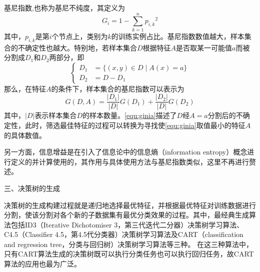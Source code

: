 基尼指数,也称为基尼不纯度，其定义为
\begin{equation}
    \label{equ:gini}
    G_i = 1 - \sum_{k=1}^n{p_{i,k}}^2
\end{equation}
其中，$p_{i,k}$是第$i$个节点上，类别为$k$的训练实例占比。基尼指数数值越大，样本集合的不确定性也越大。特别地，若样本集合$D$根据特征$A$是否取某一可能值$a$而被分割成$D_1$和$D_2$两部分，即
\begin{equation}
    \label{equ:daset}
    \left \{
    \begin{aligned}
        D_1 &= \{ (x,y) \in D \mid A(x) = a\} \\
        D_2 &= D - D_1
    \end{aligned}
    \right.
\end{equation}
那么，在特征$A$的条件下，样本集合的基尼指数可以表示为
\begin{equation}
    \label{equ:ginia}
    G(D,A) = \frac{|D_1|}{|D|}G(D_1) + \frac{|D_2|}{|D|}G(D_2)
\end{equation}
其中，$|D|$表示样本集合$D$的样本数量。\autoref{equ:ginia}描述了$D$经$A=a$分割后的不确定性，此时，筛选最佳特征的过程可以转换为寻找使\autoref{equ:ginia}取值最小的特征$A$的具体数值。

另一方面，信息增益是在引入了信息论中的信息熵（information entropy）概念进行定义的并计算使用的，其作用与具体使用方法与基尼指数类似，这里不再进行赘述\cite{Zhou2016,Li2017}。

三、决策树的生成

决策树的生成构建过程就是递归地选择最优特征，并根据最优特征对训练数据进行分割，使该分割对各个新的子数据集有最优分类效果的过程。其中，最经典生成算法包括ID3（Iterative Dichotomiser 3，第三代迭代二分器）决策树学习算法、
C4.5（Classifier 4.5，第4.5代分类器）决策树学习算法及CART（classification and regression tree，分类与回归树）决策树学习算法等三种\cite{quinlan1986,quinlan1993,breiman1984}。
在这三种算法中，只有CART算法生成的决策树既可以执行分类任务也可以执行回归任务，故CART算法的应用也最为广泛。

